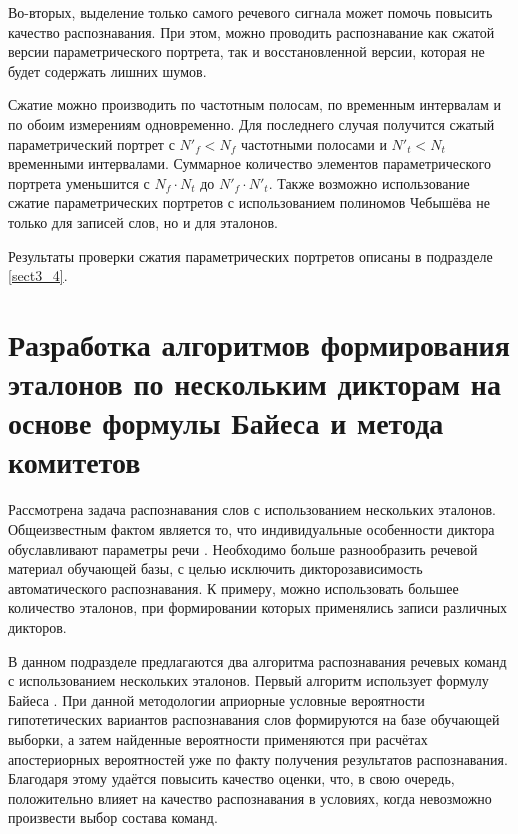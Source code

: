 Во-вторых, выделение только самого речевого сигнала может помочь повысить качество распознавания.
При этом, можно проводить распознавание как сжатой версии параметрического портрета, так и восстановленной версии, которая не будет содержать лишних шумов.

Сжатие можно производить по частотным полосам, по временным интервалам и по обоим измерениям одновременно.
Для последнего случая получится сжатый параметрический портрет с $N'_f < N_f$ частотными полосами и $N'_t < N_t$ временными интервалами.
Суммарное количество элементов параметрического портрета уменьшится с $N_f \cdot N_t$ до $N'_f \cdot N'_t$.
Также возможно использование сжатие параметрических портретов с использованием полиномов Чебышёва не только для записей слов, но и для эталонов.

Результаты проверки сжатия параметрических портретов описаны в подразделе \ref{sect3_4}.


\section{Разработка алгоритмов формирования эталонов по нескольким дикторам на основе формулы Байеса и метода комитетов} \label{sect2_5}

Рассмотрена задача распознавания слов с использованием нескольких эталонов.
Общеизвестным фактом является то, что индивидуальные особенности диктора обуславливают параметры речи \cite{rabiner1993fundamentals, korsun2017recognition}.
Необходимо больше разнообразить речевой материал обучающей базы, с целью исключить дикторозависимость автоматического распознавания.
К примеру, можно использовать большее количество эталонов, при формировании которых применялись записи различных дикторов.

В данном подразделе предлагаются два алгоритма распознавания речевых команд с использованием нескольких эталонов. 
Первый алгоритм использует формулу Байеса \cite{ventcel1999theory}.
При данной методологии априорные условные вероятности гипотетических вариантов распознавания слов формируются на базе обучающей выборки, а затем найденные вероятности применяются при расчётах апостериорных вероятностей уже по факту получения результатов распознавания.
Благодаря этому удаётся повысить качество оценки, что, в свою очередь, положительно влияет на качество распознавания в условиях, когда невозможно произвести выбор состава команд.

